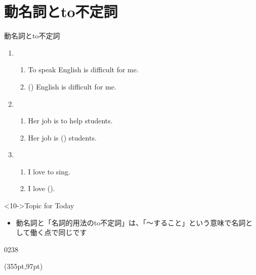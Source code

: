 \documentclass[aspectratio=169,xcolor={dvipsnames,table}]{beamer}
\begin{document}
\section{動名詞とto不定詞}
\begin{frame}[plain,t]{動名詞とto不定詞}

\begin{enumerate}
 \item<1-> \begin{enumerate}
	\item To speak English is difficult for me.
	\item () English is difficult for me.%
\hspace{51pt}
       \end{enumerate}
 \item<4->  \begin{enumerate}
	\item Her job is to help students.
	\item Her job is () students.%
\hfill{}
       \end{enumerate}
 \item<7-> \begin{enumerate}
	\item I love to sing.
	\item I love ().%
\hspace{146pt}

       \end{enumerate}
\end{enumerate}

\vspace{53pt}

\begin{block}<10->{Topic for Today}
\begin{itemize}[square]\small
 \item  動名詞と「名詞的用法のto不定詞」は、「〜すること」という意味で名詞として働く点で同じです
\end{itemize}
     \end{block}

\vspace{-15pt}

\hfill{\tiny 0238}\,{\scriptsize {}}

\begin{textblock*}{0.4\linewidth}(355pt,97pt)
\end{textblock*}


\end{frame}
\end{document}
